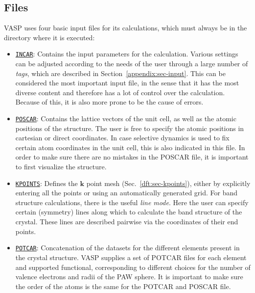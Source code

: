 \begin{refsection}
\subsection{Files} \label{appendix:sec-files}
 
VASP uses four basic input files for its calculations, which 
must always be in the directory where it is executed:
 
\begin{itemize} 
 
 \label{appendix:sec-INCAR} 
\item \href{https://www.vasp.at/wiki/index.php/INCAR}{\texttt{INCAR}}: 
Contains the input parameters for the calculation. Various settings can be 
adjusted according to the needs of the user through a large number of 
\textit{tags}, which are described in Section~\ref{appendix:sec-input}. This 
can be considered the most important input file, in the sense that it has 
the most diverse content and therefore has a lot of control over the 
calculation. Because of this, it is also more prone to be the cause of errors. 
 
 \label{appendix:sec-POSCAR} 
\item \href{https://www.vasp.at/wiki/index.php/POSCAR}{\texttt{POSCAR}}: 
Contains the lattice vectors of the unit cell, as well as the atomic positions 
of the structure. The user is free to specify the atomic positions in cartesian 
or direct coordinates. In case selective dynamics is used to fix certain atom 
coordinates in the unit cell, this is also indicated in this file. In order to 
make sure there are no mistakes in the POSCAR file, it is important to first 
visualize the structure. 
 
 \label{appendix:sec-KPOINTS} 
\item \href{https://www.vasp.at/wiki/index.php/KPOINTS}{\texttt{KPOINTS}}: 
Defines the $\mathbf{k}$ point mesh (Sec.~\ref{dft:sec-kpoints}), either by 
explicitly entering all the points or using an automatically generated 
 grid. For band structure calculations, there is the useful 
\textit{line mode}. Here the user can specify certain (symmetry) lines along 
which to calculate the band structure of the crystal. These lines are described 
pairwise via the coordinates of their end points.
 
 \label{appendix:sec-POTCAR} 
\item \href{https://www.vasp.at/wiki/index.php/POTCAR}{\texttt{POTCAR}}: 
Concatenation of the  
datasets for the different elements present in the crystal structure. VASP 
supplies a set of POTCAR files for each element and supported functional, 
corresponding to different choices for the number of valence electrons and 
radii of the PAW sphere. It is important to make sure the order of the atoms 
is the same for the POTCAR and POSCAR file. 


\end{itemize}
\end{refsection}

